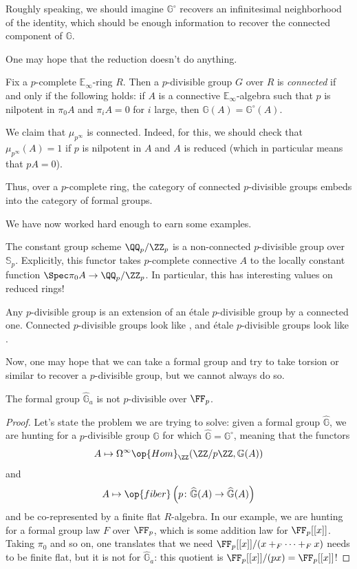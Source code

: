 \documentclass[../notes.tex]{subfiles}
\begin{document}
\begin{remark}
	Roughly speaking, we should imagine $\mathbb G^\circ$ recovers an infinitesimal neighborhood of the identity, which should be enough information to recover the connected component of $\mathbb G$.
\end{remark}
One may hope that the reduction doesn't do anything.
\begin{definition}[connected]
	Fix a $p$-complete $\mathbb E_\infty$-ring $R$. Then a $p$-divisible group $G$ over $R$ is \textit{connected} if and only if the following holds: if $A$ is a connective $\mathbb E_\infty$-algebra such that $p$ is nilpotent in $\pi_0A$ and $\pi_iA=0$ for $i$ large, then $\mathbb G(A)=\mathbb G^\circ(A)$.
\end{definition}
\begin{example} \label{ex:mu-p-connected}
	We claim that $\mu_{p^\infty}$ is connected. Indeed, for this, we should check that $\mu_{p^\infty}(A)=1$ if $p$ is nilpotent in $A$ and $A$ is reduced (which in particular means that $pA=0$).
\end{example}
\begin{remark}
	Thus, over a $p$-complete ring, the category of connected $p$-divisible groups embeds into the category of formal groups.
\end{remark}
We have now worked hard enough to earn some examples.
\begin{example} \label{ex:etale-p-div}
	The constant group scheme $\QQ_p/\ZZ_p$ is a non-connected $p$-divisible group over $\mathbb S_p$. Explicitly, this functor takes $p$-complete connective $A$ to the locally constant function $\Spec\pi_0A\to\QQ_p/\ZZ_p$. In particular, this has interesting values on reduced rings!
\end{example}
\begin{remark}
	Any $p$-divisible group is an extension of an \'etale $p$-divisible group by a connected one. Connected $p$-divisible groups look like , and \'etale $p$-divisible groups look like .
\end{remark}
Now, one may hope that we can take a formal group and try to take torsion or similar to recover a $p$-divisible group, but we cannot always do so.
\begin{exe}
	The formal group $\widehat{\mathbb G}_a$ is not $p$-divisible over $\FF_p$.
\end{exe}
\begin{proof}
	Let's state the problem we are trying to solve: given a formal group $\widehat{\mathbb G}$, we are hunting for a $p$-divisible group $\mathbb G$ for which $\widehat{\mathbb G}=\mathbb G^\circ$, meaning that the functors
	\[A\mapsto\Omega^\infty\op{Hom}_\ZZ(\ZZ/p\ZZ,\mathbb G(A))\]
	and
	\[A\mapsto\op{fiber}\left(p\colon\widehat{\mathbb G}(A)\to\widehat{\mathbb G}(A)\right)\]
	and be co-represented by a finite flat $R$-algebra. In our example, we are hunting for a formal group law $F$ over $\FF_p$, which is some addition law for $\FF_p[[x]]$. Taking $\pi_0$ and so on, one translates that we need $\FF_p[[x]]/(x+_F\cdots+_Fx)$ needs to be finite flat, but it is not for $\widehat{\mathbb G}_a$: this quotient is $\FF_p[[x]]/(px)=\FF_p[[x]]$!
\end{proof}
\end{document}
